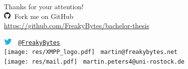  
\begin{frame}{}{\mylogo}
	{\LARGE Thanks for your attention!}
	\\[1.4em]
	
	\includegraphics[height=1em]{res/github.pdf}\ 
	Fork me on GitHub\\
	\textcolor{colorscheme}{\url{https://github.com/FreakyBytes/bachelor-thesis}}
	
	\includegraphics[height=1em]{res/twitter.png}
	\textcolor{colorscheme}{\tt\  \href{https://twitter.com/FreakyBytes}{@FreakyBytes}}\\
	
	\texttt{[image: res/XMPP\_logo.pdf]}
	\textcolor{colorscheme}{\tt\  martin@freakybytes.net}\\
	
	\texttt{[image: res/mail.pdf]}
	\textcolor{colorscheme}{\tt\  martin.peters4@uni-rostock.de} 
	
	
\end{frame}